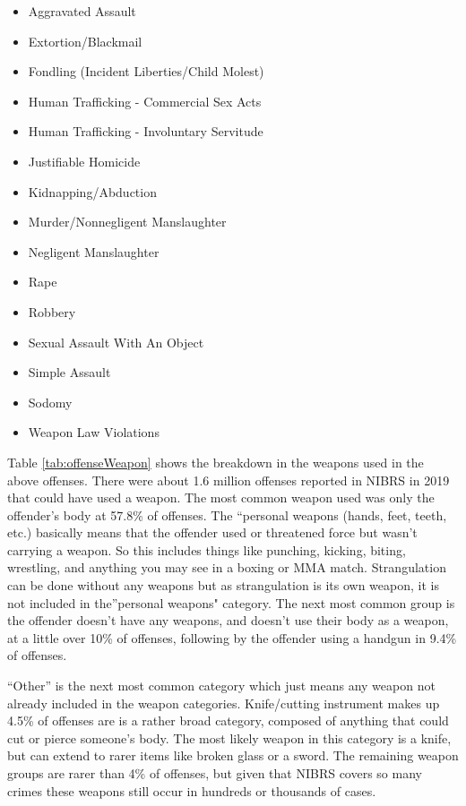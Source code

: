 \documentclass[
  12pt,
  openany]{book}
\providecommand{\tightlist}{%
  \setlength{\itemsep}{0pt}\setlength{\parskip}{0pt}}
\begin{document}
\begin{itemize}
\tightlist
\item
  Aggravated Assault
\item
  Extortion/Blackmail
\item
  Fondling (Incident Liberties/Child Molest)
\item
  Human Trafficking - Commercial Sex Acts
\item
  Human Trafficking - Involuntary Servitude
\item
  Justifiable Homicide
\item
  Kidnapping/Abduction
\item
  Murder/Nonnegligent Manslaughter
\item
  Negligent Manslaughter
\item
  Rape
\item
  Robbery
\item
  Sexual Assault With An Object
\item
  Simple Assault
\item
  Sodomy
\item
  Weapon Law Violations
\end{itemize}

Table \ref{tab:offenseWeapon} shows the breakdown in the weapons used in the above offenses. There were about 1.6 million offenses reported in NIBRS in 2019 that could have used a weapon. The most common weapon used was only the offender's body at 57.8\% of offenses. The ``personal weapons (hands, feet, teeth, etc.) basically means that the offender used or threatened force but wasn't carrying a weapon. So this includes things like punching, kicking, biting, wrestling, and anything you may see in a boxing or MMA match. Strangulation can be done without any weapons but as strangulation is its own weapon, it is not included in the''personal weapons" category. The next most common group is the offender doesn't have any weapons, and doesn't use their body as a weapon, at a little over 10\% of offenses, following by the offender using a handgun in 9.4\% of offenses.

``Other'' is the next most common category which just means any weapon not already included in the weapon categories. Knife/cutting instrument makes up 4.5\% of offenses are is a rather broad category, composed of anything that could cut or pierce someone's body. The most likely weapon in this category is a knife, but can extend to rarer items like broken glass or a sword. The remaining weapon groups are rarer than 4\% of offenses, but given that NIBRS covers so many crimes these weapons still occur in hundreds or thousands of cases.
\end{document}
